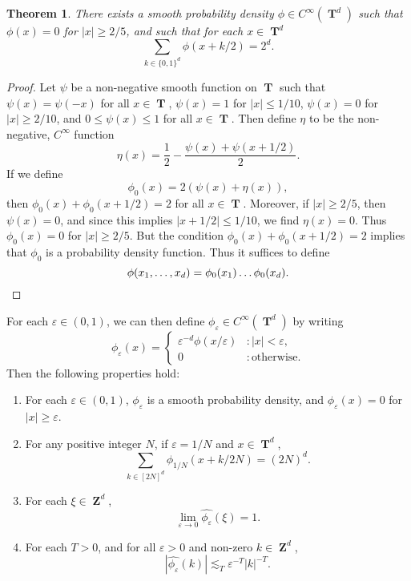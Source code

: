 \documentclass[12pt,reqno]{article}
\numberwithin{equation}{section}
\DeclareMathOperator{\ZZ}{\mathbf{Z}}
\DeclareMathOperator{\TT}{\mathbf{T}}
\newtheorem{theorem}{Theorem}
\begin{document}
\begin{theorem} \label{equationASFGCISIX}
    There exists a smooth probability density $\phi \in C^\infty(\TT^d)$ such that $\phi(x) = 0$ for $|x| \geq 2/5$, and such that for each $x \in \TT^d$
    \[ \sum_{k \in \{ 0, 1 \}^d} \phi(x + k/2) = 2^d. \]
\end{theorem}
\begin{proof}
    Let $\psi$ be a non-negative smooth function on $\TT$ such that $\psi(x) = \psi(- x)$ for all $x \in \TT$, $\psi(x) = 1$ for $|x| \leq 1/10$, $\psi(x) = 0$ for $|x| \geq 2/10$, and $0 \leq \psi(x) \leq 1$ for all $x \in \TT$. Then define $\eta$ to be the non-negative, $C^\infty$ function
    \[ \eta(x) = \frac{1}{2} - \frac{\psi(x) + \psi(x + 1/2)}{2}. \]
    If we define
    \[ \phi_0(x) = 2(\psi(x) + \eta(x)), \]
    then $\phi_0(x) + \phi_0(x + 1/2) = 2$ for all $x \in \TT$. Moreover, if $|x| \geq 2/5$, then $\psi(x) = 0$, and since this implies $|x + 1/2| \leq 1/10$, we find $\eta(x) = 0$. Thus $\phi_0(x) = 0$ for $|x| \geq 2/5$. But the condition $\phi_0(x) + \phi_0(x + 1/2) = 2$ implies that $\phi_0$ is a probability density function. Thus it suffices to define
    \[ \phi(x_1, \dots, x_d) = \phi_0(x_1) \dots \phi_0(x_d). \qedhere \]
\end{proof}

For each $\varepsilon \in (0,1)$, we can then define $\phi_\varepsilon \in C^\infty(\TT^d)$ by writing
%
\[ \phi_\varepsilon(x) = \begin{cases} \varepsilon^{-d} \phi(x/\varepsilon) &: |x| < \varepsilon, \\ 0 &: \text{otherwise}. \end{cases} \]
%
Then the following properties hold:
%
\begin{enumerate}
    \item For each $\varepsilon \in (0,1)$, $\phi_\varepsilon$ is a smooth probability density, and $\phi_\varepsilon(x) = 0$ for $|x| \geq \varepsilon$.

    \item For any positive integer $N$, if $\varepsilon = 1/N$ and $x \in \TT^d$,
    \begin{equation} \label{equation5550002352124124512}
        \sum_{k \in [2N]^d} \phi_{1/N}(x + k/2N) = (2N)^d.
    \end{equation}

    \item For each $\xi \in \ZZ^d$,
    \begin{equation} \label{approximationtoidentitypointwiseconvergence}
        \lim_{\varepsilon \to 0} \widehat{\phi_\varepsilon}(\xi) = 1.
    \end{equation}
        
    \item For each $T > 0$, and for all $\varepsilon > 0$ and non-zero $k \in \ZZ^d$,
    \begin{equation} \label{molificationdecaybound}
        |\widehat{\phi_\varepsilon}(k)| \lesssim_T \varepsilon^{-T} |k|^{-T}.
    \end{equation}
\end{enumerate}
\end{document}
